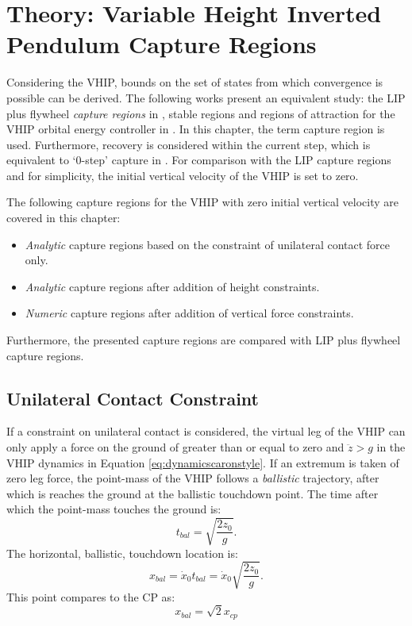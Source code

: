 %
\chapter{Theory: Variable Height Inverted Pendulum Capture Regions}\label{chap:regions}
Considering the \ac{VHIP}, bounds on the set of states from which convergence is possible can be derived. The following works present an equivalent study: the \ac{LIP} plus flywheel \textit{capture regions} in \cite{pratt2006capture}, stable regions \cite{stephens2007humanoid} and regions of attraction for the \ac{VHIP} orbital energy controller in \cite{koolen2016balance}. In this chapter, the term capture region is used. Furthermore, recovery is considered within the current step, which is equivalent to `0-step' capture in \cite{koolen2012capturability}. For comparison with the \ac{LIP} capture regions and for simplicity, the initial vertical velocity of the \ac{VHIP} is set to zero.

The following capture regions for the \ac{VHIP} with zero initial vertical velocity are covered in this chapter:
\begin{itemize}
	\item \textit{Analytic} capture regions based on the constraint of unilateral contact force only.
	\item \textit{Analytic} capture regions after addition of height constraints.
	\item \textit{Numeric} capture regions after addition of vertical force constraints.
\end{itemize}
Furthermore, the presented capture regions are compared with \ac{LIP} plus flywheel capture regions.

\section{Unilateral Contact Constraint}
If a constraint on unilateral contact is considered, the virtual leg of the \ac{VHIP} can only apply a force on the ground of greater than or equal to zero and $\ddot{z}>g$ in the \ac{VHIP} dynamics in Equation \ref{eq:dynamicscaronstyle}. If an extremum is taken of zero leg force, the point-mass of the \ac{VHIP} follows a \textit{ballistic} trajectory, after which is reaches the ground at the ballistic touchdown point. The time after which the point-mass touches the ground is:
\begin{equation}\label{eq:tbal}
	t_{bal} = \sqrt{\frac{2z_0}{g}}.
\end{equation}
The horizontal, ballistic, touchdown location is:
\begin{equation}
	x_{bal}= \dot{x}_0t_{bal}=\dot{x}_0\sqrt{\frac{2z_0}{g}}. 
	\label{eq:xbal}
\end{equation}
This point compares to the \ac{CP} as:
\begin{equation}
    x_{bal}=\sqrt{2}x_{cp}
\end{equation}


